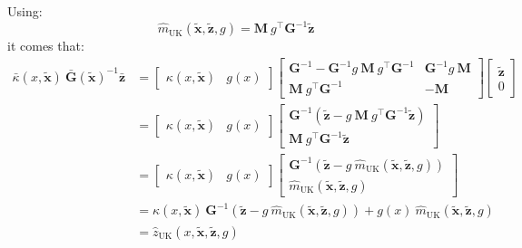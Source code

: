 Using:
\begin{equation}
	\hat{m}_{\mathrm{UK}}(\tilde{\mathbf{x}},\tilde{\mathbf{z}},g)=\mathbf{M}\:g^\top \mathbf{G}^{-1}\tilde{\mathbf{z}}
\end{equation}
it comes that:
\begin{equation}
	\begin{aligned}
	\bar{\kappa}(x,\tilde{\mathbf{x}})\:\bar{\mathbf{G}}(\tilde{\mathbf{x}})^{-1}\bar{\mathbf{z}}&=\begin{bmatrix}\kappa(x,\tilde{\mathbf{x}})&g(x)\end{bmatrix}\begin{bmatrix}\mathbf{G}^{-1}-\mathbf{G}^{-1}g\:\mathbf{M}\:g^\top \mathbf{G}^{-1}&\mathbf{G}^{-1}g\:\mathbf{M}\\\mathbf{M}\:g^\top \mathbf{G}^{-1}&-\mathbf{M}\end{bmatrix}\begin{bmatrix}\tilde{\mathbf{z}}\\0\end{bmatrix}\\
	&=\begin{bmatrix}\kappa(x,\tilde{\mathbf{x}})&g(x)\end{bmatrix}\begin{bmatrix}\mathbf{G}^{-1}\left(\tilde{\mathbf{z}}-g\:\mathbf{M}\:g^\top \mathbf{G}^{-1}\tilde{\mathbf{z}}\right)\\\mathbf{M}\:g^\top \mathbf{G}^{-1}\tilde{\mathbf{z}}\end{bmatrix}\\
	&=\begin{bmatrix}\kappa(x,\tilde{\mathbf{x}})&g(x)\end{bmatrix}\begin{bmatrix}\mathbf{G}^{-1}(\tilde{\mathbf{z}}-g\:\hat{m}_{\mathrm{UK}}(\tilde{\mathbf{x}},\tilde{\mathbf{z}},g))\\\hat{m}_{\mathrm{UK}}(\tilde{\mathbf{x}},\tilde{\mathbf{z}},g)\end{bmatrix}\\
	&=\kappa(x,\tilde{\mathbf{x}})\:\mathbf{G}^{-1}(\tilde{\mathbf{z}}-g\:\hat{m}_{\mathrm{UK}}(\tilde{\mathbf{x}},\tilde{\mathbf{z}},g))+g(x)\:\hat{m}_{\mathrm{UK}}(\tilde{\mathbf{x}},\tilde{\mathbf{z}},g)\\
	&=\hat{z}_{\mathrm{UK}}(x,\tilde{\mathbf{x}},\tilde{\mathbf{z}},g)
	\end{aligned}
\end{equation}

